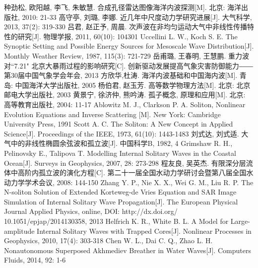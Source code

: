 \begin{thebibliography}{0}
 种劲松, 欧阳越, 李飞, 朱敏慧. 合成孔径雷达图像海洋内波探测[M]. 北京: 海洋出版社, 2010: 21-33
 高守亭, 刘璐, 李娜. 近几年中尺度动力学研究进展[J]. 大气科学, 2013, 37(2): 319-330
 吕君, 赵正予, 周晨. 次声波在非均匀运动大气中非线性传播特性的研究[J]. 物理学报,  2011, 60(10): 104301
 Uccellini L. W., Koch S. E. The Synoptic Setting and Possible Energy Sources for Mesoscale Wave Distribution[J]. Monthly Weather Review, 1987, 115(3): 721-729
 岳甫璐, 王春明, 王慧鹏. 重力波对``7.21" 北京大暴雨过程的影响研究[C]. 创新驱动发展提高气象灾害防御能力―― 第30届中国气象学会年会, 2013
 方欣华,杜涛. 海洋内波基础和中国海内波[M]. 青岛: 中国海洋大学出版社, 2005
 杨伯君, 赵玉芳. 高等数学物理方法[M]. 北京: 北京邮电大学出版社, 2003
 黄景宁, 徐济仲, 熊吟涛. 孤子概念, 原理和应用[M]. 北京: 高等教育出版社, 2004: 11-17
 Ablowitz M. J., Clarkson P. A. Soliton, Nonlinear Evolution Equations and Inverse Scattering [M]. New York: Cambridge University Press, 1991
  Scott A. C. The Soliton: A New Concept in Applied Science[J]. Proceedings of the IEEE, 1973,  61(10): 1443-1483
 刘式达, 刘式适. 大气中的非线性椭圆余弦波和孤立波[J]. 中国科学B, 1982, 4
  Grimshaw R. H., Pelinovsky E., Talipova T. Modelling Internal Solitary Waves in the Coastal Ocean[J].  Surveys in Geophysics, 2007,  28: 273-298
 程友良, 吴英杰. 有限深分层流体中高阶内孤立波的演化方程[C]. 第二十一届全国水动力学研讨会暨第八届全国水动力学学术会议,  2008: 144-150
 Zhang Y. P., Nie X. X., Wei G. M., Liu R. P. The N-soliton Solution of Extended Korteweg-de Vries Equation and SAR Image Simulation of Internal Solitary Wave Propagation[J]. The  European  Physical  Journal  Applied  Physics,  online, DOI: http://dx.doi.org/ 10.1051/epjap/2014130358,  2013
  Helfrich K. R., White B. L. A Model for Large-amplitude Internal Solitary Waves with Trapped Cores[J]. Nonlinear Processes in Geophysics, 2010, 17(4): 303-318
 Chen W. L., Dai C. Q., Zhao L. H. Nonautonomous Superposed Akhmediev Breather in Water Waves[J]. Computers Fluids, 2014, 92: 1-6


\end{thebibliography}
